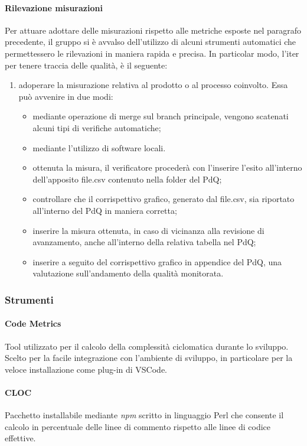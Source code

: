 \paragraph{Rilevazione misurazioni}
Per attuare adottare delle misurazioni rispetto alle metriche esposte nel paragrafo precedente, il gruppo si è avvalso dell'utilizzo di alcuni strumenti automatici che permettessero le rilevazioni in maniera rapida e precisa. In particolar modo, l'iter per tenere traccia delle qualità, è il seguente:
\begin{enumerate}
	\item adoperare la misurazione relativa al prodotto o al processo coinvolto. Essa può avvenire in due modi:
	\begin{itemize}
		\item mediante operazione di merge sul branch principale, vengono scatenati alcuni tipi di verifiche automatiche;
		\item mediante l'utilizzo di software locali.
	\item ottenuta la misura, il verificatore procederà con l'inserire l'esito all'interno dell'apposito file.csv contenuto nella folder del PdQ;
	\item controllare che il corrispettivo grafico, generato dal file.csv, sia riportato all'interno del PdQ in maniera corretta;
	\item inserire la misura ottenuta, in caso di vicinanza alla revisione di avanzamento, anche all'interno della relativa tabella nel PdQ;
	\item inserire a seguito del corrispettivo grafico in appendice del PdQ, una valutazione sull'andamento della qualità monitorata.
	\end{itemize}
\end{enumerate}

\subsubsection{Strumenti}
\paragraph{Code Metrics}
Tool utilizzato per il calcolo della complessità ciclomatica durante lo sviluppo. Scelto per la facile integrazione con l'ambiente di sviluppo, in particolare per la veloce installazione come plug-in di VSCode.

\paragraph{CLOC}
Pacchetto installabile mediante \textit{npm\glo} scritto in linguaggio Perl che consente il calcolo in percentuale delle linee di commento rispetto alle linee di codice effettive.

